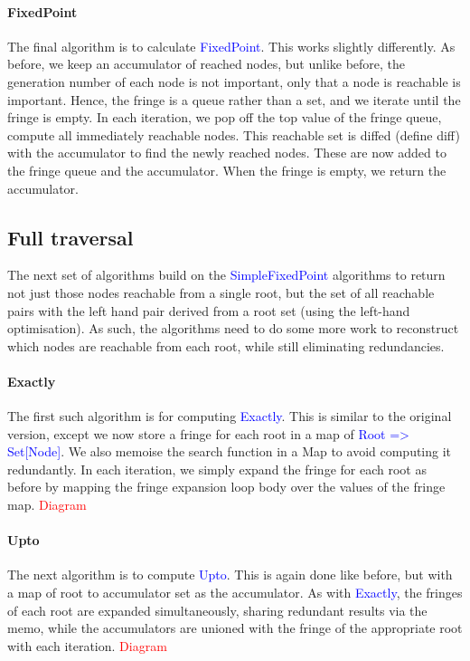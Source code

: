 \documentclass[12pt,a4paper,twoside,openright]{report}
\newcommand\todo[1]{\textcolor{red}{#1}}
\newcommand\codeName[1]{\textcolor{blue}{#1}}
\begin{document}
		\paragraph{FixedPoint}
The  final algorithm is to calculate \codeName{FixedPoint}. This works slightly differently. As before, we keep an accumulator of reached nodes, but unlike before, the generation number of each node is not important, only that a node is reachable is important. Hence, the fringe is a queue rather than a set, and we iterate until the fringe is empty. In each iteration, we pop off the top value of the fringe queue, compute all immediately reachable nodes. This reachable set is diffed (define diff) with the accumulator to find the newly reached nodes. These are now added to the fringe queue and the accumulator. When the fringe is empty, we return the accumulator.
	
	\subsection{Full traversal}
		The next set of algorithms build on the \codeName{SimpleFixedPoint} algorithms to return not just those nodes reachable from a single root, but the set of all reachable pairs with the left hand pair derived from a root set (using the left-hand optimisation). As such, the algorithms need to do some more work to reconstruct which nodes are reachable from each root, while still eliminating redundancies.
		\paragraph{Exactly}
The first such algorithm is for computing \codeName{Exactly}. This is similar to the original version, except we now store a fringe for each root in a map of \codeName{Root => Set[Node]}. We also memoise the search function in a Map to avoid computing it redundantly. In each iteration, we simply expand the fringe for each root as before by mapping the fringe expansion loop body over the values of the fringe map. \todo{Diagram}
		
		\paragraph{Upto}
The next algorithm is to compute \codeName{Upto}. This is again done like before, but with a map of root to accumulator set as the accumulator. As with \codeName{Exactly}, the fringes of each root are expanded simultaneously, sharing redundant results via the memo, while the accumulators are unioned with the fringe of the appropriate root with each iteration. \todo{Diagram}
		
\end{document}
